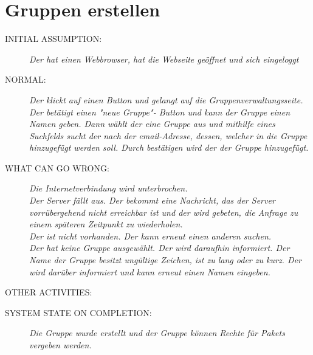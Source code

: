 \section{Gruppen erstellen}
\begin{description}
  \item [INITIAL ASSUMPTION:]
    \textit{Der  hat einen Webbrowser, hat die Webseite geöffnet und sich eingeloggt}
  \item [NORMAL:]
    \textit{Der  klickt auf einen Button und gelangt auf die Gruppenverwaltungsseite. Der  betätigt einen "neue Gruppe"- Button und kann der Gruppe einen Namen geben. Dann wählt der  eine Gruppe aus und mithilfe eines Suchfelds sucht der  nach der email-Adresse, dessen, welcher in die Gruppe hinzugefügt werden soll. Durch  bestätigen wird der  der Gruppe hinzugefügt.}
  \item [WHAT CAN GO WRONG:]
    \textit{Die Internetverbindung wird unterbrochen.\\
Der Server fällt aus. Der  bekommt eine Nachricht, das der Server vorrübergehend nicht erreichbar ist und der  wird gebeten, die Anfrage zu einem späteren Zeitpunkt zu wiederholen.\\
Der  ist nicht vorhanden. Der  kann erneut einen anderen  suchen.\\
Der  hat keine \gls{Gruppe} ausgewählt. Der  wird daraufhin informiert.
Der Name der \gls{Gruppe} besitzt ungültige Zeichen, ist zu lang oder zu kurz. Der  wird darüber informiert und kann erneut einen Namen eingeben.}
  \item [OTHER ACTIVITIES:]
    \textit{}
  \item [SYSTEM STATE ON COMPLETION:]
    \textit{Die \gls{Gruppe} wurde erstellt und der \gls{Gruppe} können Rechte für \glspl{Paket} vergeben werden.}
\end{description}

%
